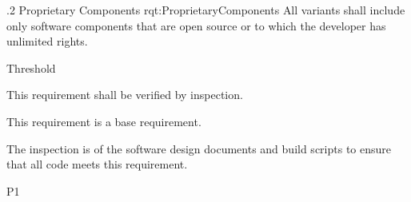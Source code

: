 
\ONERQMTV
{\RqtNumberBase.2}
{Proprietary Components}
{rqt:ProprietaryComponents}
{
All \ThisSystem variants shall include only software components that are open source or to which the developer has unlimited rights.
}
{
	\item [Phase 1] Threshold
}
{This requirement shall be verified by inspection.}
{
	\item [N/A] This requirement is a base requirement.
}
{
	\item The inspection is of the software design documents and build scripts to ensure that all code meets this requirement.
}
{P1}
